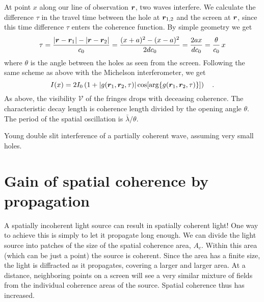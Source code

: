 At point $x$ along our line of observation $\boldsymbol{r}$, two waves interfere. We calculate the difference $\tau$ in the travel time between the hole at $\boldsymbol{r}_{1,2}$ and the screen at $\boldsymbol{r}$, since this time difference $\tau$ enters the coherence function. By simple geometry we get
\begin{equation}
    \tau = \frac{| \boldsymbol{r} - \boldsymbol{r}_1| - | \boldsymbol{r} - \boldsymbol{r}_2|}{c_0} = \frac{ (x+a)^2 - (x-a)^2}{2d c_0} = 
    \frac{2ax}{d c_0} = \frac{\theta}{c_0} \, x
\end{equation}
where $\theta$ is the angle between the holes as seen from the screen. Following the same scheme as above with the Michelson interferometer, we get
\begin{equation}
    I(x) = 2 I_0 \left( 1 + |g(\boldsymbol{r}_1, \boldsymbol{r}_2, \tau)| \cos [ \arg \{ g(\boldsymbol{r}_1, \boldsymbol{r}_2, \tau)\} ] \right) \quad .
\end{equation}
As above, the visibility $\mathcal{V}$ of the fringes drops with deceasing coherence. The characteristic decay length is coherence length divided by the opening angle $\theta$. The period of the spatial oscillation is $\bar{\lambda}/ \theta$.



\begin{marginfigure}
    \caption{Young double slit interference of a partially coherent wave, assuming very small holes.}
\end{marginfigure}


\section{Gain of spatial coherence by propagation}

A spatially incoherent light source can result in spatially coherent light! One way to achieve this is simply to let it propagate long enough. We can divide the light source into patches of the size of the spatial coherence area, $A_c$. Within this area (which can be just a point) the source is coherent. Since the area has a finite size, the light is diffracted as it propagates, covering a larger and larger area.  At a distance, neighboring points on a screen will see a very similar mixture of fields from the individual coherence areas of the source. Spatial coherence thus has increased.

